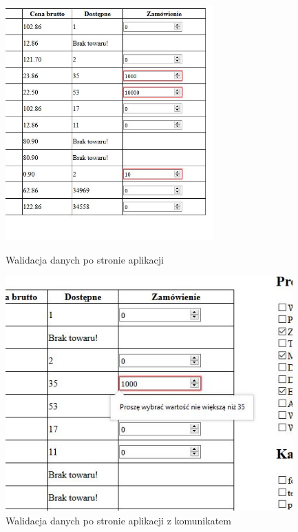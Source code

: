 \documentclass[a4paper, 12pt]{article}
\begin{document}
\begin{figure}[H]
	\centering
	\includegraphics[height=9cm]{Screeny/Walidacja1.JPG}
	\caption[Walidacja danych po stronie aplikacji]{Walidacja danych po stronie aplikacji}
	\label{fig:walidacja1}

	\includegraphics[height=9cm]{Screeny/Walidacja2.JPG}
	\caption[Walidacja danych po stronie aplikacji z komunikatem]{Walidacja danych po stronie aplikacji z komunikatem}
	\label{fig:walidacja2}
\end{figure}
\end{document}
